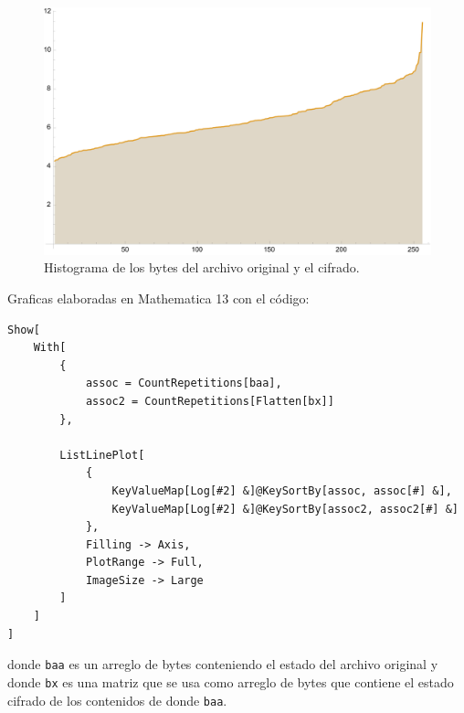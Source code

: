\documentclass[a4paper]{article}
\begin{document}
\begin{figure}[H]
    \centering
    \includegraphics[scale=0.7]{historygram.png}
    \caption*{Histograma de los bytes del archivo
original y el cifrado.}
\end{figure}

Graficas elaboradas en Mathematica 13 con el código:

\begin{verbatim}
Show[
    With[
        {
            assoc = CountRepetitions[baa],
            assoc2 = CountRepetitions[Flatten[bx]]
        },
        
        ListLinePlot[
            {
                KeyValueMap[Log[#2] &]@KeySortBy[assoc, assoc[#] &],
                KeyValueMap[Log[#2] &]@KeySortBy[assoc2, assoc2[#] &]
            },
            Filling -> Axis,
            PlotRange -> Full,
            ImageSize -> Large
        ]
    ]
]
\end{verbatim}

donde \texttt{baa} es un arreglo de bytes conteniendo el estado del archivo
original y donde \texttt{bx} es una matriz que se usa como arreglo de bytes que
contiene el estado cifrado de los contenidos de donde \texttt{baa}.
\end{document}
